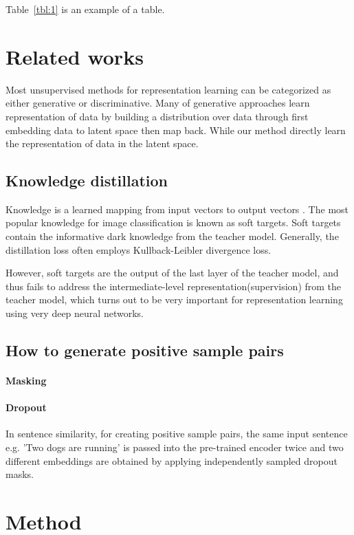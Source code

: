 \documentclass[a4paper]{article}
\theoremstyle{plain}
\theoremstyle{definition}
\begin{document}
	Table~\ref*{tbl:1} is an example of a table.
	
	\section{Related works}
	\label{sec:related}
	
	Most unsupervised methods for representation learning can be categorized as either generative or discriminative.
	Many of generative approaches learn representation of data by building a distribution over data through first embedding data to latent space then map back.
	While our method directly learn the representation of data in the latent space.

	\subsection{Knowledge distillation}
	Knowledge is a learned mapping from input vectors to output vectors \cite{hinton2015distilling} .
	The most popular knowledge for image classification is known as soft targets. 
	Soft targets contain the informative dark knowledge from the teacher model.
	Generally, the distillation loss often employs Kullback-Leibler divergence loss.

	However, soft targets are the output of the last layer of the teacher model, and thus fails to address the intermediate-level representation(supervision) from the teacher model, which turns out to be very important for representation learning using very deep neural networks.

	

	\subsection{How to generate positive sample pairs}
	\paragraph*{Masking}
	\paragraph*{Dropout} \cite{gao2021simcse} In sentence similarity, for creating positive sample pairs, the same input sentence e.g. 'Two dogs are running' is passed into the pre-trained encoder twice and two different embeddings are obtained by applying independently sampled dropout masks.  

	\section{Method}
\end{document}
